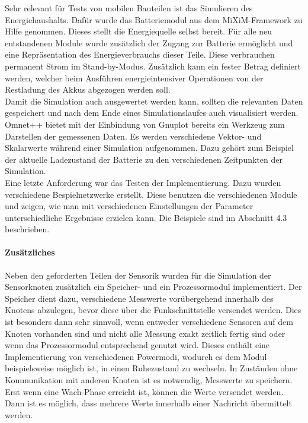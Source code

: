 Sehr relevant für Tests von mobilen Bauteilen ist das Simulieren des Energiehaushalts. Dafür wurde das Batteriemodul aus dem MiXiM-Framework zu Hilfe genommen. Dieses stellt die Energiequelle selbst bereit. Für alle neu entstandenen Module wurde zusätzlich der Zugang zur Batterie ermöglicht und eine Repräsentation des Energieverbrauchs dieser Teile. Diese verbrauchen permanent Strom im Stand-by-Modus. Zusätzlich kann ein fester Betrag definiert werden, welcher beim Ausführen energieintensiver Operationen von der Restladung des Akkus abgezogen werden soll.\\
Damit die Simulation auch ausgewertet werden kann, sollten die relevanten Daten gespeichert und nach dem Ende eines Simulationslaufes auch visualisiert werden. Omnet++ bietet mit der Einbindung von Gnuplot bereits ein Werkzeug zum Darstellen der gemessenen Daten. Es werden verschiedene Vektor- und Skalarwerte während einer Simulation aufgenommen. Dazu gehört zum Beispiel der aktuelle Ladezustand der Batterie zu den verschiedenen Zeitpunkten der Simulation.\\
Eine letzte Anforderung war das Testen der Implementierung. Dazu wurden verschiedene Bespielnetzwerke erstellt. Diese benutzen die verschiedenen Module und zeigen, wie man mit verschiedenen Einstellungen der Parameter unterschiedliche Ergebnisse erzielen kann. Die Beispiele sind im Abschnitt 4.3 beschrieben.
\paragraph{Zusätzliches}
Neben den geforderten Teilen der Sensorik wurden für die Simulation der Sensorknoten zusätzlich ein Speicher- und ein Prozessormodul implementiert. Der Speicher dient dazu, verschiedene Messwerte vorübergehend innerhalb des Knotens abzulegen, bevor diese über die Funkschnittstelle versendet werden. Dies ist besonders dann sehr sinnvoll, wenn entweder verschiedene Sensoren auf dem Knoten vorhanden sind und nicht alle Messung exakt zeitlich fertig sind oder wenn das Prozessormodul entsprechend genutzt wird. Dieses enthält eine Implementierung von verschiedenen Powermodi, wodurch es dem Modul beispielsweise möglich ist, in einen Ruhezustand zu wechseln. In Zuständen ohne Kommunikation mit anderen Knoten ist es notwendig, Messwerte zu speichern. Erst wenn eine Wach-Phase erreicht ist, können die Werte versendet werden. Dann ist es möglich, dass mehrere Werte innerhalb einer Nachricht übermittelt werden.
